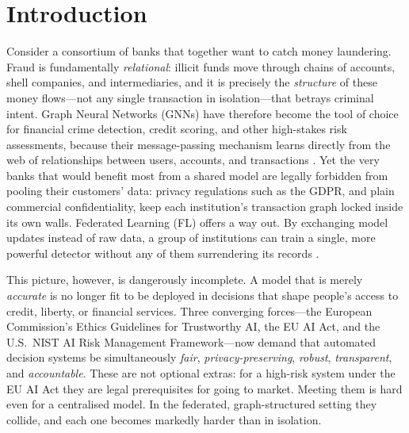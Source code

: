 \documentclass[pdflatex,sn-mathphys-num]{sn-jnl}
\theoremstyle{thmstyleone}%
\theoremstyle{thmstyletwo}%
\theoremstyle{thmstylethree}%
\begin{document}

\maketitle

\section{Introduction}
\label{sec:intro}

\noindent Consider a consortium of banks that together want to catch money
laundering. Fraud is fundamentally \emph{relational}: illicit funds move through
chains of accounts, shell companies, and intermediaries, and it is precisely the
\emph{structure} of these money flows---not any single transaction in
isolation---that betrays criminal intent. Graph Neural Networks (GNNs) have
therefore become the tool of choice for financial crime detection, credit
scoring, and other high-stakes risk assessments, because their message-passing
mechanism learns directly from the web of relationships between users, accounts,
and transactions \cite{kipf2016semi,velickovic2017graph,dou2020enhancing}. Yet
the very banks that would benefit most from a shared model are legally forbidden
from pooling their customers' data: privacy regulations such as the GDPR, and
plain commercial confidentiality, keep each institution's transaction graph
locked inside its own walls. Federated Learning (FL) offers a way out. By
exchanging model updates instead of raw data, a group of institutions can train
a single, more powerful detector without any of them surrendering its records
\cite{mcmahan2017communication}.

This picture, however, is dangerously incomplete. A model that is merely
\emph{accurate} is no longer fit to be deployed in decisions that shape people's
access to credit, liberty, or financial services. Three converging forces---the
European Commission's Ethics Guidelines for Trustworthy AI, the EU AI Act, and
the U.S.\ NIST AI Risk Management Framework---now demand that automated
decision systems be simultaneously \emph{fair}, \emph{privacy-preserving},
\emph{robust}, \emph{transparent}, and \emph{accountable}. These are not
optional extras: for a high-risk system under the EU AI Act they are legal
prerequisites for going to market. Meeting them is hard even for a centralised
model. In the federated, graph-structured setting they collide, and each one
becomes markedly harder than in isolation.
\end{document}
